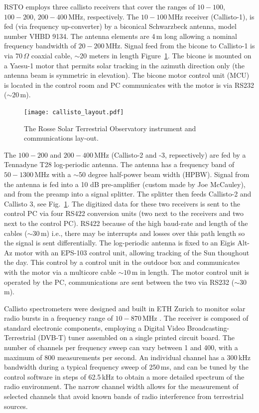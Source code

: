 RSTO employs three callisto receivers that cover the ranges of $10-100$, $100-200$, $200-400$\,MHz, respectively. The $10-100$\,MHz receiver (Callisto-1), is fed (via frequency up-converter) by a biconical Schwarzbeck antenna, model number VHBD 9134. The antenna elements are 4\,m long allowing a nominal frequency bandwidth of $20-200$\,MHz. Signal feed from the bicone to Callisto-1 is via $70\,\Omega$ coaxial cable, $\sim$20 meters in length Figure~\ref{fig:rsto_layout}. The bicone is mounted on a Yaesu-1 motor that permits solar tracking in the azimuth direction only (the antenna beam is symmetric in elevation). The bicone motor control unit (MCU) is located in the control room and PC communicates with the motor is via RS232 ($\sim20$\,m).
\begin{figure}
    \centering
\texttt{[image: callisto\_layout.pdf]}
\caption[RSTO Instrumental Setup]{The Rosse Solar Terrestrial Observatory instrument and communications lay-out.}
\label{fig:rsto_layout}
\end{figure}

The $100-200$ and $200-400$\,MHz (Callisto-2 and -3, repsectively) are fed by a Tennadyne T28 log-periodic antenna. The antenna has a frequency band of $50 -1300$\,MHz with a $\sim$50 degree half-power beam width (HPBW). Signal from the antenna is fed into a 10 dB pre-amplifier (custom made by Joe McCauley), and from the preamp into a signal splitter. The splitter then feeds Callisto-2 and Callisto 3, see Fig.~\ref{fig:rsto_layout}. The digitized data for these two receivers is sent to the control PC via four RS422 conversion units (two next to the receivers and two next to the control PC). RS422 because of the high baud-rate and length of the cables ($\sim30$\,m) i.e., there may be interrupts and losses over this path length so the signal is sent differentially. The log-periodic antenna is fixed to an Eigis Alt-Az motor with an EPS-103 control unit, allowing tracking of the Sun thoughout the day. This control by a control unit in the outdoor box and communicates with the motor via a multicore cable $\sim10$\,m in length. The motor control unit is operated by the PC, communications are sent between the two via RS232 ($\sim30$\,m).

Callisto spectrometers were designed and built in ETH Zurich to monitor solar radio bursts in a frequency range of $10 - 870$\,MHz \citep{Benz2005}. The receiver is composed of standard electronic components, employing a Digital Video Broadcasting-Terrestrial (DVB-T) tuner assembled on a single printed circuit board. The number of channels per frequency sweep can vary between 1 and 400, with a maximum of 800 measurements per second. An individual channel has a 300\,kHz bandwidth during a typical frequency sweep of 250\,ms, and can be tuned by the control software in steps of 62.5\,kHz to obtain a more detailed spectrum of the radio environment. The narrow channel width allows for the measurement of selected channels that avoid known bands of radio interference from terrestrial sources.

